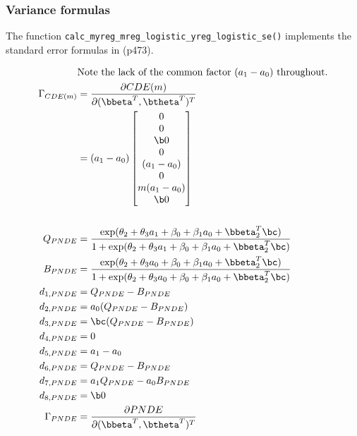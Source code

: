 \documentclass[dvipdfmx,10pt]{article}
\begin{document}
\subsubsection{Variance formulas}
\label{sec:orga68395a}
The function \texttt{calc\_myreg\_mreg\_logistic\_yreg\_logistic\_se()} implements the standard error formulas in \cite{vanderweeleExplanationCausalInference2015} (p473).

\begin{align*}
  &\text{Note the lack of the common factor $(a_{1} - a_{0})$ throughout.}\\
  \Gamma_{CDE(m)}
  &= \frac{\partial CDE(m)}{\partial (\bbeta^{T},\btheta^{T})^{T}}\\
  &= (a_{1}-a_{0})
    \begin{bmatrix}
      0\\
      0\\
      \b0\\
      0\\
      (a_{1} - a_{0})\\
      0\\
      m(a_{1} - a_{0})\\
      \b0\\
    \end{bmatrix}\\
  \\
  Q_{PNDE} &= \frac
             {    \exp(\theta_{2} + \theta_{3}a_{1} + \beta_{0} + \beta_{1}a_{0} + \bbeta_{2}^{T}\bc)}
             {1 + \exp(\theta_{2} + \theta_{3}a_{1} + \beta_{0} + \beta_{1}a_{0} + \bbeta_{2}^{T}\bc)}\\
  B_{PNDE} &= \frac
             {    \exp(\theta_{2} + \theta_{3}a_{0} + \beta_{0} + \beta_{1}a_{0} + \bbeta_{2}^{T}\bc)}
             {1 + \exp(\theta_{2} + \theta_{3}a_{0} + \beta_{0} + \beta_{1}a_{0} + \bbeta_{2}^{T}\bc)}\\
      d_{1,PNDE} &= Q_{PNDE} - B_{PNDE}\\
      d_{2,PNDE} &= a_{0} (Q_{PNDE} - B_{PNDE})\\
      d_{3,PNDE} &= \bc (Q_{PNDE} - B_{PNDE})\\
      d_{4,PNDE} &= 0\\
      d_{5,PNDE} &= a_{1} - a_{0}\\
      d_{6,PNDE} &= Q_{PNDE} - B_{PNDE}\\
      d_{7,PNDE} &= a_{1}Q_{PNDE} - a_{0}B_{PNDE}\\
      d_{8,PNDE} &= \b0\\
  \Gamma_{PNDE}
  &= \frac{\partial PNDE}{\partial (\bbeta^{T},\btheta^{T})^{T}}\\

\end{align*}
\end{document}
